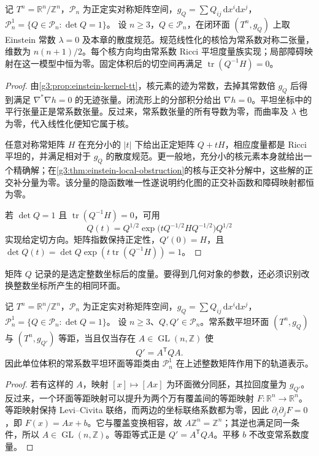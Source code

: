 \begin{proposition}\label{g3:prop:flat-torus-einstein-kernel}
	记 \(T^n=\mathbb R^n/\mathbb Z^n\)，\(\mathcal P_n\) 为正定实对称矩阵空间，\(g_Q=\sum Q_{ij}\,\mathrm dx^i\mathrm dx^j\)，\(\mathcal P_n^1=\{Q\in\mathcal P_n:\det Q=1\}\)。
	设 \(n\ge3\)，\(Q\in\mathcal P_n\)，在闭环面 \((T^n,g_Q)\) 上取 Einstein 常数 \(\lambda=0\) 及本章的散度规范。规范线性化的核恰为常系数对称二张量，维数为 \(n(n+1)/2\)。每个核方向均由常系数 Ricci 平坦度量族实现；局部障碍映射在这一模型中恒为零。固定体积后的切空间再满足 \(\operatorname{tr}(Q^{-1}H)=0\)。
\end{proposition}
\begin{proof}
	由\cref{g3:prop:einstein-kernel-tt}，核元素的迹为常数，去掉其常数倍 \(g_Q\) 后得到满足 \(\nabla^*\nabla h=0\) 的无迹张量。闭流形上的分部积分给出 \(\nabla h=0\)。平坦坐标中的平行张量正是常系数张量。反过来，常系数张量的所有导数为零，而曲率及 \(\lambda\) 也为零，代入线性化便知它属于核。

	任意对称常矩阵 \(H\) 在充分小的 \(|t|\) 下给出正定矩阵 \(Q+tH\)，相应度量都是 Ricci 平坦的，并满足相对于 \(g_Q\) 的散度规范。更一般地，充分小的核元素本身就给出一个精确解；在\cref{g3:thm:einstein-local-obstruction}的核与正交补分解中，这些解的正交补分量为零。该分量的隐函数唯一性遂说明约化图的正交补函数和障碍映射都恒为零。

	若 \(\det Q=1\) 且 \(\operatorname{tr}(Q^{-1}H)=0\)，可用
	\[
		Q(t)=Q^{1/2}\exp\bigl(tQ^{-1/2}HQ^{-1/2}\bigr)Q^{1/2}
	\]
	实现给定切方向。矩阵指数保持正定性，\(Q'(0)=H\)，且 \(\det Q(t)=\det Q\exp(t\operatorname{tr}(Q^{-1}H))=1\)。
\end{proof}

矩阵 \(Q\) 记录的是选定整数坐标后的度量。要得到几何对象的参数，还必须识别改换整数坐标所产生的相同环面。

\begin{proposition}\label{g3:prop:flat-torus-matrix-moduli}
	记 \(T^n=\mathbb R^n/\mathbb Z^n\)，\(\mathcal P_n\) 为正定实对称矩阵空间，\(g_Q=\sum Q_{ij}\,\mathrm dx^i\mathrm dx^j\)，\(\mathcal P_n^1=\{Q\in\mathcal P_n:\det Q=1\}\)。
	设 \(n\ge3\)、\(Q,Q'\in\mathcal P_n\)。常系数平坦环面 \((T^n,g_Q)\) 与 \((T^n,g_{Q'})\) 等距，当且仅当存在 \(A\in\operatorname{GL}(n,\mathbb Z)\) 使
	\[
		Q'=A^{\mathsf T}QA.
	\]
	因此单位体积的常系数平坦环面等距类由 \(\mathcal P_n^1\) 在上述整数矩阵作用下的轨道表示。
\end{proposition}
\begin{proof}
	若有这样的 \(A\)，映射 \([x]\mapsto[Ax]\) 为环面微分同胚，其拉回度量为 \(g_{Q'}\)。反过来，一个环面等距映射可以提升为两个万有覆盖间的等距映射 \(F:\mathbb R^n\to\mathbb R^n\)。等距映射保持 Levi--Civita 联络，而两边的坐标联络系数都为零，因此 \(\partial_i\partial_jF=0\)，即 \(F(x)=Ax+b\)。它与覆盖变换相容，故 \(A\mathbb Z^n=\mathbb Z^n\)；其逆也满足同一条件，所以 \(A\in\operatorname{GL}(n,\mathbb Z)\)。等距等式正是 \(Q'=A^{\mathsf T}QA\)。平移 \(b\) 不改变常系数度量。
\end{proof}

